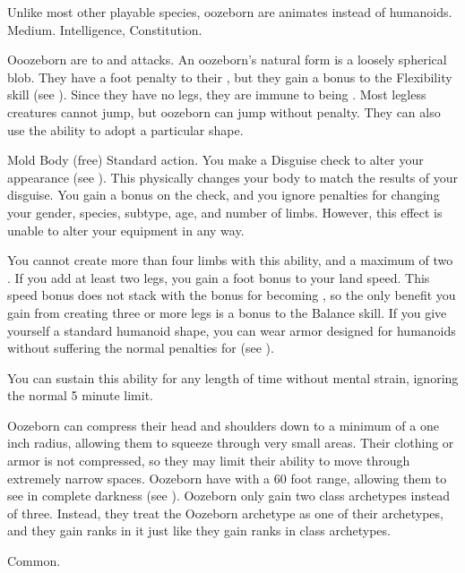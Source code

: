    Unlike most other playable species, oozeborn are animates instead of humanoids.
   Medium.
    Intelligence,  Constitution.
  \begin{itemize}
     Ooozeborn are  to \atAcid and \atPoison attacks.
     An oozeborn's natural form is a loosely spherical blob.
      They have a  foot penalty to their , but they gain a  bonus to the Flexibility skill (see ).
      Since they have no legs, they are immune to being \prone.
      Most legless creatures cannot jump, but oozeborn can jump without penalty.
      They can also use the  ability to adopt a particular shape.
      \begin{sustainability}{Mold Body}{ (free)}
        \abilityusagetime Standard action.
        \rankline
        You make a Disguise check to alter your appearance (see ).
        This physically changes your body to match the results of your disguise.
        You gain a  bonus on the check, and you ignore penalties for changing your gender, species, subtype, age, and number of limbs.
        However, this effect is unable to alter your equipment in any way.

        You cannot create more than four limbs with this ability, and a maximum of two .
        If you add at least two legs, you gain a  foot bonus to your land speed.
        This speed bonus does not stack with the bonus for becoming , so the only benefit you gain from creating three or more legs is a  bonus to the Balance skill.
        If you give yourself a standard humanoid shape, you can wear armor designed for humanoids without suffering the normal penalties for  (see ).

        You can sustain this ability for any length of time without mental strain, ignoring the normal 5 minute limit.
      \end{sustainability}
     Oozeborn can compress their head and shoulders down to a minimum of a one inch radius, allowing them to squeeze through very small areas.
      Their clothing or armor is not compressed, so they may limit their ability to move through extremely narrow spaces.
     Oozeborn have  with a 60 foot range, allowing them to see in complete darkness (see ).
     Oozeborn only gain two class archetypes instead of three.
      Instead, they treat the Oozeborn archetype as one of their archetypes, and they gain ranks in it just like they gain ranks in class archetypes.
  \end{itemize}
   Common.

